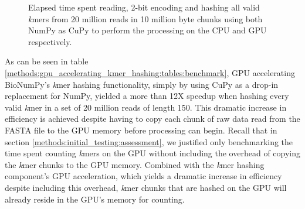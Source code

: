 \begin{figure}[H]
\hspace*{7em}
\caption{
  Elapsed time spent reading, 2-bit encoding and hashing all valid \textit{k}mers from 20 million reads in 10 million byte chunks using both NumPy as CuPy to perform the processing on the CPU and GPU respectively.
}
\label{methods:gpu_accelerating_kmer_hashing:figures:benchmark}
\end{figure}

As can be seen in table \ref{methods:gpu_accelerating_kmer_hashing:tables:benchmark}, GPU accelerating BioNumPy's \textit{k}mer hashing functionality, simply by using CuPy as a drop-in replacement for NumPy, yielded a more than 12X speedup when hashing every valid \textit{k}mer in a set of 20 million reads of length 150.
This dramatic increase in efficiency is achieved despite having to copy each chunk of raw data read from the FASTA file to the GPU memory before processing can begin.
Recall that in section \ref{methods:initial_testing:assessment}, we justified only benchmarking the time spent counting \textit{k}mers on the GPU without including the overhead of copying the \textit{k}mer chunks to the GPU memory.
Combined with the \textit{k}mer hashing component's GPU acceleration, which yields a dramatic increase in efficiency despite including this overhead, \textit{k}mer chunks that are hashed on the GPU will already reside in the GPU's memory for counting.
